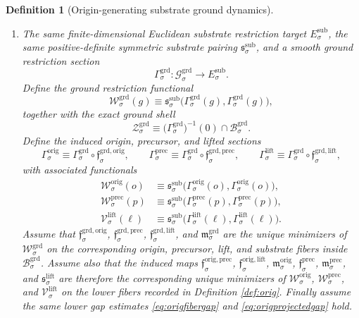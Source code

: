 \documentclass[11pt]{article}
\newcommand{\SubTarget}[1]{E_{#1}^{\mathrm{sub}}}
\newcommand{\SubPair}[1]{\mathfrak s_{#1}^{\mathrm{sub}}}
\newcommand{\LiftSelect}[1]{\mathfrak s_{#1}^{\mathrm{lift}}}
\newcommand{\LiftSection}[1]{\Gamma_{#1}^{\mathrm{lift}}}
\newcommand{\LiftFunctional}[1]{\mathscr V_{#1}^{\mathrm{lift}}}
\newcommand{\PrecLiftMin}[1]{\mathfrak f_{#1}^{\mathrm{prec}}}
\newcommand{\PrecSubMin}[1]{\mathfrak m_{#1}^{\mathrm{prec}}}
\newcommand{\PrecSection}[1]{\Gamma_{#1}^{\mathrm{prec}}}
\newcommand{\PrecFunctional}[1]{\mathscr W_{#1}^{\mathrm{prec}}}
\newcommand{\OrigPrecMin}[1]{\mathfrak f_{#1}^{\mathrm{orig,prec}}}
\newcommand{\OrigLiftMin}[1]{\mathfrak f_{#1}^{\mathrm{orig,lift}}}
\newcommand{\OrigSubMin}[1]{\mathfrak m_{#1}^{\mathrm{orig}}}
\newcommand{\OrigSection}[1]{\Gamma_{#1}^{\mathrm{orig}}}
\newcommand{\OrigFunctional}[1]{\mathscr W_{#1}^{\mathrm{orig}}}
\newcommand{\GroundSpace}[1]{\mathcal G_{#1}^{\mathrm{grd}}}
\newcommand{\GroundBody}[1]{\mathcal B_{#1}^{\mathrm{grd}}}
\newcommand{\GroundOrigMin}[1]{\mathfrak f_{#1}^{\mathrm{grd,orig}}}
\newcommand{\GroundPrecMin}[1]{\mathfrak f_{#1}^{\mathrm{grd,prec}}}
\newcommand{\GroundLiftMin}[1]{\mathfrak f_{#1}^{\mathrm{grd,lift}}}
\newcommand{\GroundSubMin}[1]{\mathfrak m_{#1}^{\mathrm{grd}}}
\newcommand{\GroundSection}[1]{\Gamma_{#1}^{\mathrm{grd}}}
\newcommand{\GroundFunctional}[1]{\mathscr W_{#1}^{\mathrm{grd}}}
\newcommand{\GroundShellSet}[1]{\mathcal Z_{#1}^{\mathrm{grd}}}
\newtheorem{definition}{Definition}
\begin{document}
\begin{definition}[Origin-generating substrate ground dynamics]
\begin{enumerate}
    \item The same finite-dimensional Euclidean substrate restriction target \(\SubTarget{\sigma}\), the same positive-definite symmetric substrate pairing \(\SubPair{\sigma}\), and a smooth ground restriction section
    \[
    \GroundSection{\sigma}:\GroundSpace{\sigma}\to\SubTarget{\sigma}.
    \]
    Define the ground restriction functional
    \begin{equation}
    \GroundFunctional{\sigma}(g)
    \equiv
    \SubPair{\sigma}\bigl(\GroundSection{\sigma}(g),\GroundSection{\sigma}(g)\bigr),
    \label{eq:groundfunctional}
    \end{equation}
    together with the exact ground shell
    \begin{equation}
    \GroundShellSet{\sigma}
    \equiv
    \bigl(\GroundSection{\sigma}\bigr)^{-1}(0)\cap\GroundBody{\sigma}.
    \label{eq:groundshell}
    \end{equation}
    Define the induced origin, precursor, and lifted sections
    \begin{equation}
    \OrigSection{\sigma}
    \equiv
    \GroundSection{\sigma}\circ\GroundOrigMin{\sigma},
    \qquad
    \PrecSection{\sigma}
    \equiv
    \GroundSection{\sigma}\circ\GroundPrecMin{\sigma},
    \qquad
    \LiftSection{\sigma}
    \equiv
    \GroundSection{\sigma}\circ\GroundLiftMin{\sigma},
    \label{eq:groundinducedsections}
    \end{equation}
    with associated functionals
    \begin{equation}
    \begin{aligned}
    \OrigFunctional{\sigma}(o)
    &\equiv
    \SubPair{\sigma}\bigl(\OrigSection{\sigma}(o),\OrigSection{\sigma}(o)\bigr),
    \\
    \PrecFunctional{\sigma}(p)
    &\equiv
    \SubPair{\sigma}\bigl(\PrecSection{\sigma}(p),\PrecSection{\sigma}(p)\bigr),
    \\
    \LiftFunctional{\sigma}(\ell)
    &\equiv
    \SubPair{\sigma}\bigl(\LiftSection{\sigma}(\ell),\LiftSection{\sigma}(\ell)\bigr).
    \end{aligned}
    \label{eq:groundinducedfunctionals}
    \end{equation}
    Assume that \(\GroundOrigMin{\sigma}\), \(\GroundPrecMin{\sigma}\), \(\GroundLiftMin{\sigma}\), and \(\GroundSubMin{\sigma}\) are the unique minimizers of \(\GroundFunctional{\sigma}\) on the corresponding origin, precursor, lift, and substrate fibers inside \(\GroundBody{\sigma}\). Assume also that the induced maps \(\OrigPrecMin{\sigma}\), \(\OrigLiftMin{\sigma}\), \(\OrigSubMin{\sigma}\), \(\PrecLiftMin{\sigma}\), \(\PrecSubMin{\sigma}\), and \(\LiftSelect{\sigma}\) are therefore the corresponding unique minimizers of \(\OrigFunctional{\sigma}\), \(\PrecFunctional{\sigma}\), and \(\LiftFunctional{\sigma}\) on the lower fibers recorded in Definition \ref{def:orig}. Finally assume the same lower gap estimates \eqref{eq:origfibergap} and \eqref{eq:origprojectedgap} hold.


\end{enumerate}
\end{definition}
\end{document}
